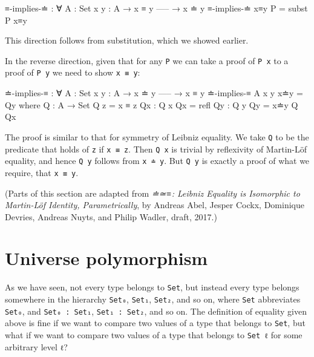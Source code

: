 \begin{fence}
\begin{code}
≡-implies-≐ : ∀ {A : Set} {x y : A}
  → x ≡ y
    -----
  → x ≐ y
≡-implies-≐ x≡y P  =  subst P x≡y
\end{code}
\end{fence}

This direction follows from substitution, which we showed earlier.

In the reverse direction, given that for any \texttt{P} we can take a
proof of \texttt{P\ x} to a proof of \texttt{P\ y} we need to show
\texttt{x\ ≡\ y}:

\begin{fence}
\begin{code}
≐-implies-≡ : ∀ {A : Set} {x y : A}
  → x ≐ y
    -----
  → x ≡ y
≐-implies-≡ {A} {x} {y} x≐y  =  Qy
  where
    Q : A → Set
    Q z = x ≡ z
    Qx : Q x
    Qx = refl
    Qy : Q y
    Qy = x≐y Q Qx
\end{code}
\end{fence}

The proof is similar to that for symmetry of Leibniz equality. We take
\texttt{Q} to be the predicate that holds of \texttt{z} if
\texttt{x\ ≡\ z}. Then \texttt{Q\ x} is trivial by reflexivity of
Martin-Löf equality, and hence \texttt{Q\ y} follows from
\texttt{x\ ≐\ y}. But \texttt{Q\ y} is exactly a proof of what we
require, that \texttt{x\ ≡\ y}.

(Parts of this section are adapted from \emph{≐≃≡: Leibniz Equality is
Isomorphic to Martin-Löf Identity, Parametrically}, by Andreas Abel,
Jesper Cockx, Dominique Devries, Andreas Nuyts, and Philip Wadler,
draft, 2017.)

\hypertarget{Equality-unipoly}{%
\section{Universe polymorphism}\label{Equality-unipoly}}

As we have seen, not every type belongs to \texttt{Set}, but instead
every type belongs somewhere in the hierarchy \texttt{Set₀},
\texttt{Set₁}, \texttt{Set₂}, and so on, where \texttt{Set} abbreviates
\texttt{Set₀}, and \texttt{Set₀\ :\ Set₁}, \texttt{Set₁\ :\ Set₂}, and
so on. The definition of equality given above is fine if we want to
compare two values of a type that belongs to \texttt{Set}, but what if
we want to compare two values of a type that belongs to \texttt{Set\ ℓ}
for some arbitrary level \texttt{ℓ}?


